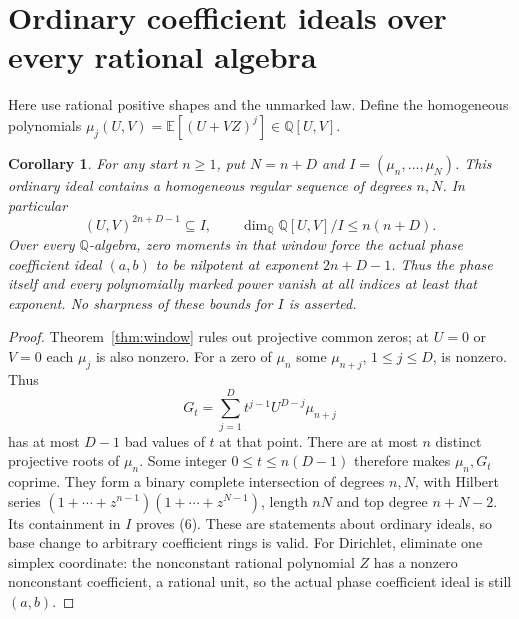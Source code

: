 \documentclass[11pt]{article}
\newtheorem{corollary}[theorem]{Corollary}
\newcommand{\Q}{\mathbb Q}
\newcommand{\E}{\mathbb E}
\begin{document}
\section{Ordinary coefficient ideals over every rational algebra}
Here use rational positive shapes and the unmarked law. Define the
homogeneous polynomials
$\mu_j(U,V)=\E[(U+VZ)^j]\in\Q[U,V]$.

\begin{corollary}\label{cor:ideal}
For any start $n\geq1$, put $N=n+D$ and
$I=(\mu_n,\ldots,\mu_N)$. This ordinary ideal contains a homogeneous
regular sequence of degrees $n,N$. In particular
\[
 (U,V)^{2n+D-1}\subseteq I,\qquad
 \dim_\Q\Q[U,V]/I\leq n(n+D).                       \tag{6}
\]
Over every $\Q$-algebra, zero moments in that window force the actual
phase coefficient ideal $(a,b)$ to be nilpotent at exponent $2n+D-1$.
Thus the phase itself and every polynomially marked power vanish at all
indices at least that exponent. No sharpness of these bounds for $I$
is asserted.
\end{corollary}
\begin{proof}
Theorem~\ref{thm:window} rules out projective common zeros; at $U=0$
or $V=0$ each $\mu_j$ is also nonzero. For a zero of $\mu_n$ some
$\mu_{n+j}$, $1\leq j\leq D$, is nonzero. Thus
\[
 G_t=\sum_{j=1}^D t^{j-1}U^{D-j}\mu_{n+j}
\]
has at most $D-1$ bad values of $t$ at that point. There are at most $n$
distinct projective roots of $\mu_n$. Some integer
$0\leq t\leq n(D-1)$ therefore makes $\mu_n,G_t$ coprime.
They form a binary complete intersection of degrees $n,N$, with Hilbert
series $(1+\cdots+z^{n-1})(1+\cdots+z^{N-1})$, length $nN$ and top
degree $n+N-2$. Its containment in $I$ proves (6). These are statements
about ordinary ideals, so base change to arbitrary coefficient rings is
valid. For Dirichlet, eliminate one simplex coordinate: the nonconstant
rational polynomial $Z$ has a nonzero nonconstant coefficient, a rational
unit, so the actual phase coefficient ideal is still $(a,b)$.
\end{proof}
\end{document}
